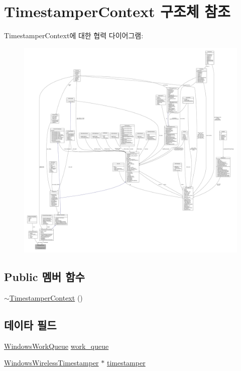 \hypertarget{struct_timestamper_context}{}\section{Timestamper\+Context 구조체 참조}
\label{struct_timestamper_context}


Timestamper\+Context에 대한 협력 다이어그램\+:
\nopagebreak
\begin{figure}[H]
\begin{center}
\leavevmode
\includegraphics[width=350pt]{struct_timestamper_context__coll__graph}
\end{center}
\end{figure}
\subsection*{Public 멤버 함수}
\begin{DoxyCompactItemize}
\item 
\hyperlink{struct_timestamper_context_af2c2f68481ba7280005b68147a91a2f5}{$\sim$\+Timestamper\+Context} ()
\end{DoxyCompactItemize}
\subsection*{데이타 필드}
\begin{DoxyCompactItemize}
\item 
\hyperlink{class_windows_work_queue}{Windows\+Work\+Queue} \hyperlink{struct_timestamper_context_a7b3e21543015452f5af47b58cd6f4fae}{work\+\_\+queue}
\item 
\hyperlink{class_windows_wireless_timestamper}{Windows\+Wireless\+Timestamper} $\ast$ \hyperlink{struct_timestamper_context_a3a11352e788e274aa34578727c3ceba7}{timestamper}
\end{DoxyCompactItemize}


